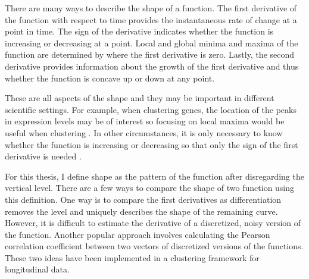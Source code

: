 There are many ways to describe the shape of a function. The first derivative of the function with respect to time provides the instantaneous rate of change at a point in time. The sign of the derivative indicates whether the function is increasing or decreasing at a point.  Local and global minima and maxima of the function are determined by where the first derivative is zero. Lastly, the second derivative provides information about the growth of the first derivative and thus whether the function is concave up or down at any point. 

These are all aspects of the shape and they may be important in different scientific settings. For example, when clustering genes, the location of the peaks in expression levels may be of interest so focusing on local maxima would be useful when clustering \cite{luan2003}. In other circumstances, it is only necessary to know whether the function is increasing or decreasing so that only the sign of the first derivative is needed \cite{phang2003}. 

For this thesis, I define shape as the pattern of the function after disregarding the vertical level. There are a few ways to compare the shape of two function using this definition. One way is to compare the first derivatives as differentiation removes the level and uniquely describes the shape of the remaining curve. However, it is difficult to estimate the derivative of a discretized, noisy version of the function. Another popular approach involves calculating the Pearson correlation coefficient between two vectors of discretized versions of the functions. These two ideas have been implemented in a clustering framework for longitudinal data.

